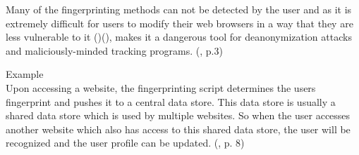 Many of the fingerprinting methods can not be detected by the user and as it is extremely difficult for users to modify their web browsers in a way that they are less vulnerable to it (\textcite{amiunique})(\textcite{miele18}), makes it a dangerous tool for deanonymization attacks and maliciously-minded tracking programs. (\textcite{havens16}, p.3)\\
\begin{tcolorbox}
Example\\
Upon accessing a website, the fingerprinting script determines the users fingerprint and pushes it to a central data store. This data store is usually a shared data store which is used by multiple websites. So when the user accesses another website which also has access to this shared data store, the user will be recognized and the user profile can be updated. (\textcite{havens16}, p. 8)
\end{tcolorbox}

